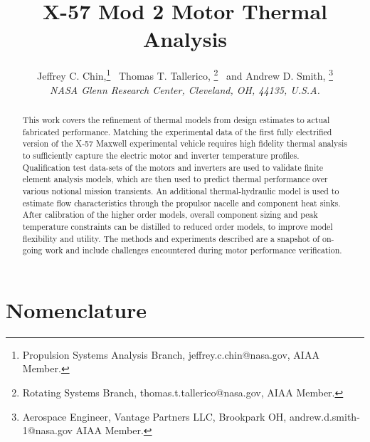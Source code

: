 \documentclass[]{aiaa-tc}%
\title{X-57 Mod 2 Motor Thermal Analysis}
\author{
  Jeffrey C. Chin,\thanks{Propulsion Systems Analysis Branch, jeffrey.c.chin@nasa.gov, AIAA Member.} \
  Thomas T. Tallerico, \thanks{Rotating Systems Branch, thomas.t.tallerico@nasa.gov, AIAA Member.} \
  and Andrew D. Smith, \thanks{Aerospace Engineer, Vantage Partners LLC, Brookpark OH, andrew.d.smith-1@nasa.gov AIAA Member.} \\
  {\normalsize \itshape NASA Glenn Research Center, Cleveland, OH, 44135, U.S.A.} }
\begin{document}
\maketitle

\begin{abstract}

This work covers the refinement of thermal models from design estimates to actual fabricated performance. Matching the experimental data of the first fully electrified version of the X-57 Maxwell experimental vehicle requires high fidelity thermal analysis to sufficiently capture the electric motor and inverter temperature profiles. Qualification test data-sets of the motors and inverters are used to validate finite element analysis models, which are then used to predict thermal performance over various notional mission transients. An additional thermal-hydraulic model is used to estimate flow characteristics through the propulsor nacelle and component heat sinks. After calibration of the higher order models, overall component sizing and peak temperature constraints can be distilled to reduced order models, to improve model flexibility and utility. The methods and experiments described are a snapshot of on-going work and include challenges encountered during motor performance verification.



\end{abstract}


%
\section{Nomenclature}
\end{document}
